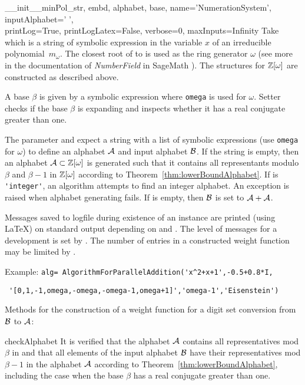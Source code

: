 \begin{method}{\_\_init\_\_}{minPol\_str, embd, alphabet, base, name='NumerationSystem', inputAlphabet=' ',\\
 printLog=True, printLogLatex=False, verbose=0, maxInputs=Infinity}
Take  which is a string of symbolic expression in the variable $x$ of an irreducible polynomial~$m_\omega$. The closest root of   to  is used as the ring generator $\omega$ (see more in the documentation of \emph{NumberField} in SageMath \cite{sage}). The structures for $\mathbb{Z}[\omega]$ are constructed as described above. 

A base $\beta$ is given by a symbolic expression  where \verb+omega+ is used for $\omega$.
Setter  checks if the base $\beta$ is expanding and inspects whether it has a real conjugate greater than one.

The parameter  and  expect a string with a list of symbolic expressions (use \verb+omega+ for $\omega$) to define an alphabet $\mathcal{A}$ and input alphabet $\mathcal{B}$. If the string  is empty, then an alphabet $\mathcal{A}\subset\mathbb{Z}[\omega]$ is generated such that it contains all representants modulo $\beta$ and $\beta-1$ in $\mathbb{Z}[\omega]$ according to Theorem~\ref{thm:lowerBoundAlphabet}. %
If  is \verb+'integer'+, %
 an algorithm attempts to find an integer alphabet. An exception is raised when alphabet generating fails. If   is empty, then $\mathcal{B}$ is set to $\mathcal{A}+\mathcal{A}$.

Messages saved to logfile during existence of an instance are printed (using \LaTeX) on standard output depending on  and . The level of messages for a development is set by . The number of entries in a constructed weight function may be limited by .

Example:
\verb|alg= AlgorithmForParallelAddition('x^2+x+1',-0.5+0.8*I,|

\verb| '[0,1,-1,omega,-omega,-omega-1,omega+1]','omega-1','Eisenstein')|
\end{method}

Methods for the construction of a weight function for a digit set conversion from $\mathcal{B}$ to $\mathcal{A}$:
\begin{method}{checkAlphabet}{}
It is verified that the alphabet $\mathcal{A}$ contains all representatives mod $\beta$ in  and that all elements of the input alphabet $\mathcal{B}$ have their representatives mod $\beta-1$ in the alphabet $\mathcal{A}$ according to Theorem~\ref{thm:lowerBoundAlphabet}, including the case when the base $\beta$ has a real conjugate greater than one.
\end{method}

